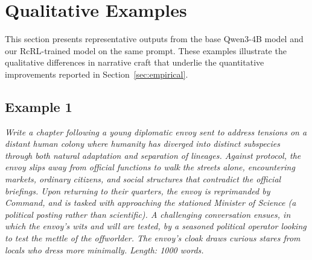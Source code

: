 \documentclass{article}
\theoremstyle{plain}
\theoremstyle{definition}
\theoremstyle{remark}
\begin{document}
\begin{table}[h]
  \vspace{0.3cm}
    \label{tab:human-eval}

\end{table}

\section{Qualitative Examples}
\label{app:qualitative}

This section presents representative outputs from the base Qwen3-4B model and our RcRL-trained model on the same prompt. These examples illustrate the qualitative differences in narrative craft that underlie the quantitative improvements reported in Section~\ref{sec:empirical}.

\subsection{Example 1}

\begin{tcolorbox}[colback=blue!3, colframe=blue!50!black, title=\textbf{Prompt}, fonttitle=\bfseries]
\textit{Write a chapter following a young diplomatic envoy sent to address tensions on a distant human colony where humanity has diverged into distinct subspecies through both natural adaptation and separation of lineages. Against protocol, the envoy slips away from official functions to walk the streets alone, encountering markets, ordinary citizens, and social structures that contradict the official briefings. Upon returning to their quarters, the envoy is reprimanded by Command, and is tasked with approaching the stationed Minister of Science (a political posting rather than scientific). A challenging conversation ensues, in which the envoy's wits and will are tested, by a seasoned political operator looking to test the mettle of the offworlder. The envoy’s cloak draws curious stares from locals who dress more minimally. Length: 1000 words.}
\end{tcolorbox}
\end{document}
